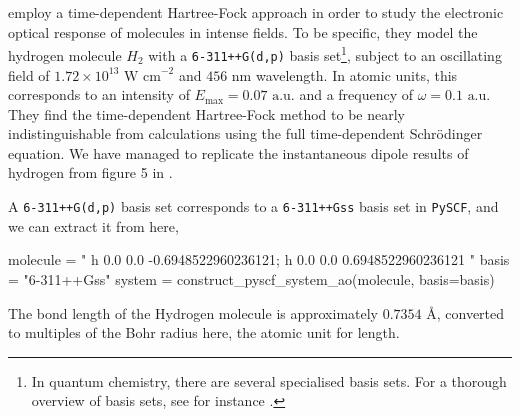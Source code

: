 \citeauthor{li2005time} \cite{li2005time} employ a time-dependent Hartree-Fock 
approach in order to study the electronic optical response of molecules 
in intense fields. To be specific, they model the hydrogen molecule $H_2$ 
with a \lstinline{6-311++G(d,p)} basis 
set\footnote{In quantum chemistry, there are several specialised basis sets. For a
thorough overview of basis sets, see for instance
\citeauthor{jensen2017introduction} \cite{jensen2017introduction}.}, subject to an oscillating field 
of $1.72\times10^{13}\text{ W cm}^{-2}$ and $456\text{ nm}$ wavelength. 
In atomic units, this corresponds to an intensity of $E_\text{max} = 0.07 \text{ a.u.}$ and
a frequency of $\omega=0.1 \text{ a.u.}$
They find the time-dependent
Hartree-Fock method to be nearly indistinguishable from calculations using the 
full time-dependent Schrödinger equation. We have managed to replicate the 
instantaneous dipole results of hydrogen from figure 5 in
\citeauthor{li2005time} \cite{li2005time}.

A \lstinline{6-311++G(d,p)} basis set corresponds to a \lstinline{6-311++Gss} 
basis set in \lstinline{PySCF}, and we can extract it from here,
\begin{python}
molecule = "
    h 0.0 0.0 -0.6948522960236121;
    h 0.0 0.0  0.6948522960236121
    "
basis = "6-311++Gss"
system = construct_pyscf_system_ao(molecule, basis=basis)
\end{python}
The bond length of the Hydrogen molecule is approximately $0.7354\text{ Å}$, converted 
to multiples of the Bohr radius here, the atomic unit for length.

